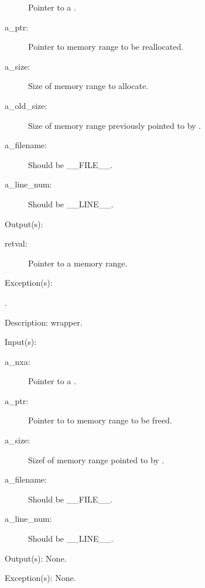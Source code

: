 \begin{capi}
\begin{capilist}
\begin{description}
			Pointer to a .
		\item[a\_ptr: ]
			Pointer to memory range to be reallocated.
		\item[a\_size: ]
			Size of memory range to allocate.
		\item[a\_old\_size: ]
			Size of memory range previously pointed to by
			.
		\item[a\_filename: ]
			Should be \_\_FILE\_\_.
		\item[a\_line\_num: ]
			Should be \_\_LINE\_\_.
		\end{description}
	\item[Output(s): ]
		\begin{description}\item[]
		\item[retval: ]
			Pointer to a memory range.
		\end{description}
	\item[Exception(s): ]
		\begin{description}\item[]
		\item[.]
		\end{description}
	\item[Description: ]
		 wrapper.
	\end{capilist}
\label{nxa_free_e}
\label{nxa_free}
	\begin{capilist}
	\item[Input(s): ]
		\begin{description}\item[]
		\item[a\_nxa: ]
			Pointer to a .
		\item[a\_ptr: ]
			Pointer to to memory range to be freed.
		\item[a\_size: ]
			Sizef of memory range pointed to by .
		\item[a\_filename: ]
			Should be \_\_FILE\_\_.
		\item[a\_line\_num: ]
			Should be \_\_LINE\_\_.
		\end{description}
	\item[Output(s): ] None.
	\item[Exception(s): ] None.

\end{capilist}
\end{capi}
